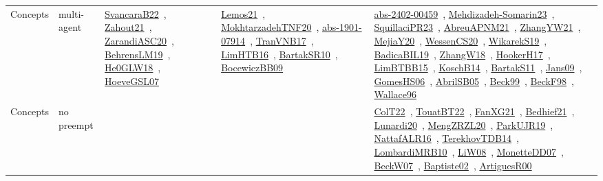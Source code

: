 {\begin{longtable}{lp{3cm}>{\raggedright\arraybackslash}p{6cm}>{\raggedright\arraybackslash}p{6cm}>{\raggedright\arraybackslash}p{8cm}}
Concepts & multi-agent & \href{works/SvancaraB22.pdf}{SvancaraB22}~\cite{SvancaraB22}, \href{works/Zahout21.pdf}{Zahout21}~\cite{Zahout21}, \href{works/ZarandiASC20.pdf}{ZarandiASC20}~\cite{ZarandiASC20}, \href{works/BehrensLM19.pdf}{BehrensLM19}~\cite{BehrensLM19}, \href{works/He0GLW18.pdf}{He0GLW18}~\cite{He0GLW18}, \href{works/HoeveGSL07.pdf}{HoeveGSL07}~\cite{HoeveGSL07} & \href{works/Lemos21.pdf}{Lemos21}~\cite{Lemos21}, \href{works/MokhtarzadehTNF20.pdf}{MokhtarzadehTNF20}~\cite{MokhtarzadehTNF20}, \href{works/abs-1901-07914.pdf}{abs-1901-07914}~\cite{abs-1901-07914}, \href{works/TranVNB17.pdf}{TranVNB17}~\cite{TranVNB17}, \href{works/LimHTB16.pdf}{LimHTB16}~\cite{LimHTB16}, \href{works/BartakSR10.pdf}{BartakSR10}~\cite{BartakSR10}, \href{works/BocewiczBB09.pdf}{BocewiczBB09}~\cite{BocewiczBB09} & \href{works/abs-2402-00459.pdf}{abs-2402-00459}~\cite{abs-2402-00459}, \href{works/Mehdizadeh-Somarin23.pdf}{Mehdizadeh-Somarin23}~\cite{Mehdizadeh-Somarin23}, \href{works/SquillaciPR23.pdf}{SquillaciPR23}~\cite{SquillaciPR23}, \href{works/AbreuAPNM21.pdf}{AbreuAPNM21}~\cite{AbreuAPNM21}, \href{works/ZhangYW21.pdf}{ZhangYW21}~\cite{ZhangYW21}, \href{works/MejiaY20.pdf}{MejiaY20}~\cite{MejiaY20}, \href{works/WessenCS20.pdf}{WessenCS20}~\cite{WessenCS20}, \href{works/WikarekS19.pdf}{WikarekS19}~\cite{WikarekS19}, \href{works/BadicaBIL19.pdf}{BadicaBIL19}~\cite{BadicaBIL19}, \href{works/ZhangW18.pdf}{ZhangW18}~\cite{ZhangW18}, \href{works/HookerH17.pdf}{HookerH17}~\cite{HookerH17}, \href{works/LimBTBB15.pdf}{LimBTBB15}~\cite{LimBTBB15}, \href{works/KoschB14.pdf}{KoschB14}~\cite{KoschB14}, \href{works/BartakS11.pdf}{BartakS11}~\cite{BartakS11}, \href{works/Jans09.pdf}{Jans09}~\cite{Jans09}, \href{works/GomesHS06.pdf}{GomesHS06}~\cite{GomesHS06}, \href{works/AbrilSB05.pdf}{AbrilSB05}~\cite{AbrilSB05}, \href{works/Beck99.pdf}{Beck99}~\cite{Beck99}, \href{works/BeckF98.pdf}{BeckF98}~\cite{BeckF98}, \href{works/Wallace96.pdf}{Wallace96}~\cite{Wallace96}\\
Concepts & no preempt &  &  & \href{works/ColT22.pdf}{ColT22}~\cite{ColT22}, \href{works/TouatBT22.pdf}{TouatBT22}~\cite{TouatBT22}, \href{works/FanXG21.pdf}{FanXG21}~\cite{FanXG21}, \href{works/Bedhief21.pdf}{Bedhief21}~\cite{Bedhief21}, \href{works/Lunardi20.pdf}{Lunardi20}~\cite{Lunardi20}, \href{works/MengZRZL20.pdf}{MengZRZL20}~\cite{MengZRZL20}, \href{works/ParkUJR19.pdf}{ParkUJR19}~\cite{ParkUJR19}, \href{works/NattafALR16.pdf}{NattafALR16}~\cite{NattafALR16}, \href{works/TerekhovTDB14.pdf}{TerekhovTDB14}~\cite{TerekhovTDB14}, \href{works/LombardiMRB10.pdf}{LombardiMRB10}~\cite{LombardiMRB10}, \href{works/LiW08.pdf}{LiW08}~\cite{LiW08}, \href{works/MonetteDD07.pdf}{MonetteDD07}~\cite{MonetteDD07}, \href{works/BeckW07.pdf}{BeckW07}~\cite{BeckW07}, \href{works/Baptiste02.pdf}{Baptiste02}~\cite{Baptiste02}, \href{works/ArtiguesR00.pdf}{ArtiguesR00}~\cite{ArtiguesR00}\\

\end{longtable}}
